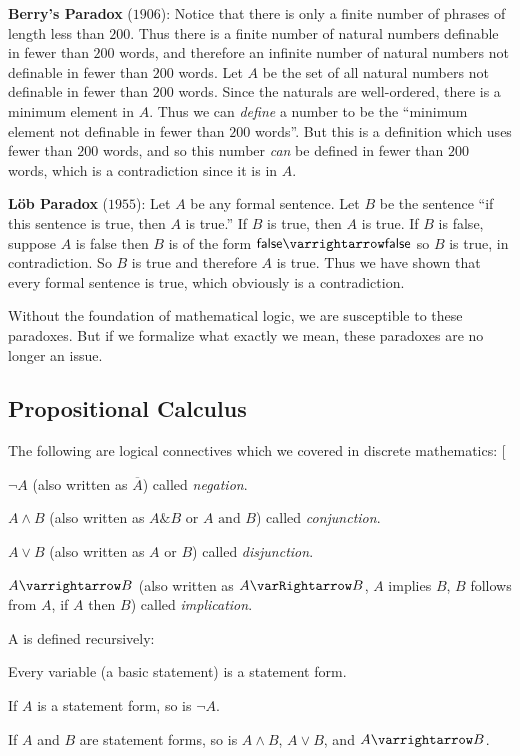 \documentclass[10pt]{article}
\makeatletter
\def\@blist[#1]{%
    \bgroup\bgroup\par\vskip-\medskipamount%
    \gdef\item{%
        \par\egroup\bgroup\medskip\setbox0=\hbox{#1\quad}%
        \advance\leftskip by \wd0\leavevmode\kern-\wd0\box0%
    }%
}
\def\blist{\@ifnextchar[ \@blist {\@blist[$\bullet$]}}
\def\elist{\par\egroup\egroup\medskip}
\makeatother
\begin{document}
    \item \textbf{Berry's Paradox} ($1906$): Notice that there is only a finite number of phrases of length less than $200$.
    Thus there is a finite number of natural numbers definable in fewer than $200$ words, and therefore an infinite number of natural numbers not definable in fewer than $200$ words.
    Let $A$ be the set of all natural numbers not definable in fewer than $200$ words.
    Since the naturals are well-ordered, there is a minimum element in $A$.
    Thus we can \textit{define} a number to be the ``minimum element not definable in fewer than $200$ words''.
    But this is a definition which uses fewer than $200$ words, and so this number \textit{can} be defined in fewer than $200$ words, which is a contradiction since it is in $A$.

    \item \textbf{L\"ob Paradox} ($1955$): Let $A$ be any formal sentence.
    Let $B$ be the sentence ``if this sentence is true, then $A$ is true.''
    If $B$ is true, then $A$ is true.
    If $B$ is false, suppose $A$ is false then $B$ is of the form $\mathsf{false}\varrightarrow\mathsf{false}$ so $B$ is true, in contradiction.
    So $B$ is true and therefore $A$ is true.
    Thus we have shown that every formal sentence is true, which obviously is a contradiction.
\eenum

Without the foundation of mathematical logic, we are susceptible to these paradoxes.
But if we formalize what exactly we mean, these paradoxes are no longer an issue.

\subsection{Propositional Calculus}

The following are logical connectives which we covered in discrete mathematics:
\blist
    \item $\neg A$ (also written as $\overline A$) called \emph{negation}.
    \item $A\land B$ (also written as $A\&B$ or $A\text{ and }B$) called \emph{conjunction}.
    \item $A\lor B$ (also written as $A\text{ or }B$) called \emph{disjunction}.
    \item $A\varrightarrow B$ (also written as $A\varRightarrow B$, $A$ implies $B$, $B$ follows from $A$, if $A$ then $B$) called \emph{implication}.
\elist

\begin{defn*}

    A  is defined recursively:
    \benum
        \item Every variable (a basic statement) is a statement form.
        \item If $A$ is a statement form, so is $\neg A$.
        \item If $A$ and $B$ are statement forms, so is $A\land B$, $A\lor B$, and $A\varrightarrow B$.
    \eenum

\end{defn*}
\end{document}
